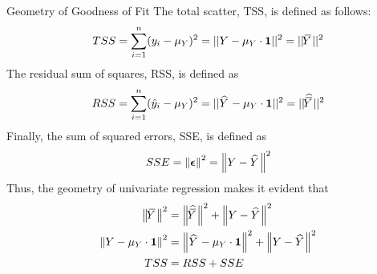 \begin{frame}{Geometry of Goodness of Fit}
The total scatter, TSS, is defined as follows:
\begin{align*}
    TSS = \sum_{i=1}^n (y_i - \mu_Y)^2 = ||{Y - \mu_Y \cdot \bone}||^2 =
    ||{\mY}||^2
\end{align*}
The residual sum of squares, RSS, is defined as
\begin{align*}
RSS = \sum_{i=1}^n (\hy_i - \mu_Y)^2 = ||{\hY - \mu_Y \cdot \bone}||^2 = ||{\hmY}||^2
\end{align*}
Finally, the sum of squared errors, SSE, is defined as
\begin{align*}
    SSE = \norm{\bepsilon}^2 = \norm{Y -\hY}^2
\end{align*}
Thus, the geometry of univariate regression makes it evident that
\begin{align*}
    \norm{\mY}^2 & = \norm{\hmY}^2 + \norm{Y-\hY}^2\\
    \norm{Y - \mu_Y \cdot \bone}^2 & = \norm{\hY -
    \mu_Y\cdot\bone}^2 + \norm{Y-\hY}^2\\
    TSS & = RSS + SSE
\end{align*}
%
%
\end{frame}

